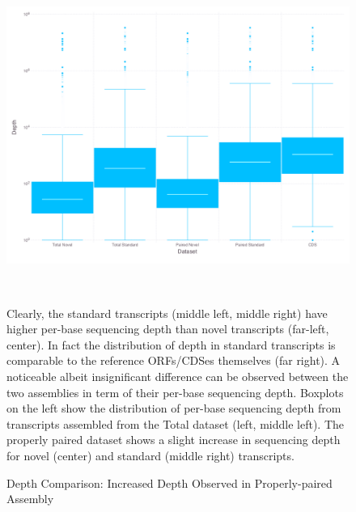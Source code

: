 \begin{figure}
\small
\begin{center}
\includegraphics[width=\textwidth,height=4in]{images/Assembly/Comparison/PairvsTot_boxplot.png}
\end{center}
\caption{Depth Comparison: Increased Depth Observed in Properly-paired Assembly}\label{fig:5.1}
Clearly, the standard transcripts (middle left, middle right) have higher per-base sequencing depth than novel transcripts (far-left, center). In fact the distribution of depth in standard transcripts is comparable to the reference ORFs/CDSes themselves (far right). A noticeable albeit insignificant difference can be observed between the two assemblies in term of their per-base sequencing depth. Boxplots on the left show the distribution of per-base sequencing depth from transcripts assembled from the Total dataset (left, middle left). The properly paired dataset shows a slight increase in sequencing depth for novel (center) and standard (middle right) transcripts.
\end{figure}


